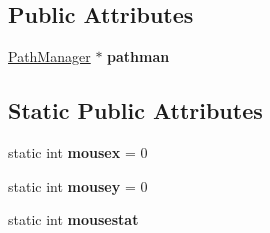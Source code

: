 \subsection*{Public Attributes}
\begin{DoxyCompactItemize}
\item 
\hyperlink{classPathManager}{Path\+Manager} $\ast$ {\bfseries pathman}\hypertarget{classNavigationSystem_a05cc3c6d3b2f4e85b36739b50bd2c2a5}{}\label{classNavigationSystem_a05cc3c6d3b2f4e85b36739b50bd2c2a5}

\end{DoxyCompactItemize}
\subsection*{Static Public Attributes}
\begin{DoxyCompactItemize}
\item 
static int {\bfseries mousex} = 0\hypertarget{classNavigationSystem_a08d0aa56bb7da1ebde4e5c55db2c3654}{}\label{classNavigationSystem_a08d0aa56bb7da1ebde4e5c55db2c3654}

\item 
static int {\bfseries mousey} = 0\hypertarget{classNavigationSystem_a8f4a0a8f9f5aee2d7af804cffa74885c}{}\label{classNavigationSystem_a8f4a0a8f9f5aee2d7af804cffa74885c}

\item 
static int {\bfseries mousestat}\hypertarget{classNavigationSystem_ab948d5a3e00beb918ee21d8235b67131}{}\label{classNavigationSystem_ab948d5a3e00beb918ee21d8235b67131}

\end{DoxyCompactItemize}
